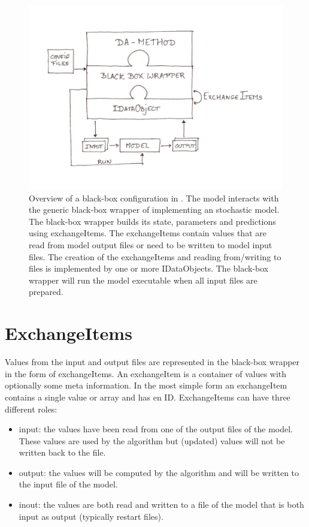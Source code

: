 \begin{figure}[h]
\begin{center}
\includegraphics[scale=0.7]{./blackbox/bb_overview.pdf}
\caption{Overview of a black-box configuration in \oda. The model interacts
  with the generic black-box wrapper of \oda implementing an \oda stochastic
  model. The black-box wrapper builds its state, parameters and predictions
  using exchangeItems. The exchangeItems contain values that are read from
  model output files or need to be written to model input files. The creation
  of the exchangeItems and reading from/writing to files is implemented by one
  or more IDataObjects. The black-box wrapper will run the model executable when
  all input files are prepared.}
\label{Fig:overview}
\end{center}
\end{figure}


\section{ExchangeItems}
Values from the input and output files are represented in the \oda black-box
wrapper in the form of exchangeItems. An exchangeItem is a container of values
with optionally some meta information. In the most simple form an exchangeItem
contains a single value or array and has en ID. ExchangeItems can have three
different roles:
\begin{itemize}
\item input: the values have been read from one of the output files of the
  model. These values are used by the algorithm but (updated) values will not
  be written back to the file.
\item output: the values will be computed by the algorithm and will be written
  to the input file of the model.
\item inout: the values are both read and written to a file of the model that
  is both input as output (typically restart files).
\end{itemize}

